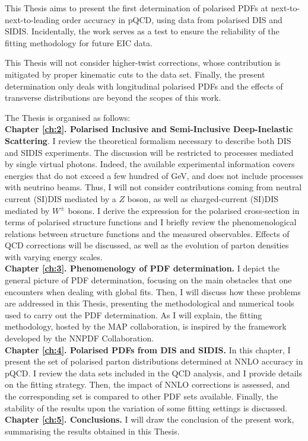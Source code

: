 This Thesis aims to present the first determination of polarised PDFs at next-to-next-to-leading order accuracy in pQCD, using data from polarised DIS and SIDIS. Incidentally, the work serves as a test to ensure the reliability of the fitting methodology for future EIC data.%

This Thesis will not consider higher-twist corrections, whose contribution is mitigated by proper kinematic cuts to the data set. Finally, the present determination only deals with longitudinal polarised PDFs and the effects of transverse distributions are beyond the scopes of this work.%

The Thesis is organised as follows:\\[10pt]
\begingroup
\textbf{Chapter \ref{ch:2}. Polarised Inclusive and Semi-Inclusive Deep-Inelastic Scattering}. I review the theoretical formalism necessary to describe both DIS and SIDIS experiments. The discussion will be restricted to processes mediated by single virtual photons. Indeed, the available experimental information covers energies that do not exceed a few hundred of GeV, and does not include processes with neutrino beams. Thus, I will not consider contributions coming from neutral current (SI)DIS mediated by a $Z$ boson, as well as charged-current (SI)DIS mediated by $W^{\pm}$ bosons. I derive the expression for the polarised cross-section in terms of polarised structure functions and I briefly review the phenomenological relations between structure functions and the measured observables. Effects of QCD corrections will be discussed, as well as the evolution of parton densities with varying energy scales.
\\[5pt]
\textbf{Chapter \ref{ch:3}. Phenomenology of PDF determination.} I depict the general picture of PDF determination, focusing on the main obstacles that one encounters when dealing with global fits. Then, I will discuss how these problems are addressed in this Thesis, presenting the methodological and numerical tools used to carry out the PDF determination. As I will explain, the fitting methodology, hosted by the MAP collaboration, is inspired by the framework developed by the NNPDF Collaboration.
\\[5pt]
\textbf{Chapter \ref{ch:4}. Polarised PDFs from DIS and SIDIS.} In this chapter, I present the set of polarised parton distributions determined at NNLO accuracy in pQCD. I review the data sets included in the QCD analysis, and I provide details on the fitting strategy. Then, the impact of NNLO corrections is assessed, and the corresponding set is compared to other PDF sets available. Finally, the stability of the results upon the variation of some fitting settings is discussed.
\\[5pt]
\textbf{Chapter \ref{ch:5}. Conclusions.} I will draw the conclusion of the present work, summarising the results obtained in this Thesis.
\endgroup